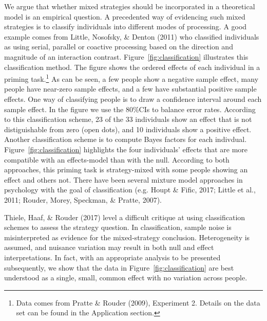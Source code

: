 \documentclass[english,man]{apa6}
\theoremstyle{definition}
\theoremstyle{definition}
\theoremstyle{remark}
\begin{document}
We argue that whether mixed strategies should be incorporated in a
theoretical model is an empirical question. A precedented way of
evidencing such mixed strategies is to classify individuals into
different modes of processing. A good example comes from Little,
Nosofsky, \& Denton (2011) who classified individuals as using serial,
parallel or coactive processing based on the direction and magnitude of
an interaction contrast. Figure~\ref{fig:classification} illustrates
this classification method. The figure shows the ordered effects of each
individual in a priming task.\footnote{Data comes from Pratte \& Rouder
  (2009), Experiment 2. Details on the data set can be found in the
  Application section.} As can be seen, a few people show a negative
sample effect, many people have near-zero sample effects, and a few have
substantial positive sample effects. One way of classifying people is to
draw a confidence interval around each sample effect. In the figure we
use the 80\%CIs to balance error rates. According to this classification
scheme, 23 of the 33 individuals show an effect that is not
distiguishable from zero (open dots), and 10 individuals show a positive
effect. Another classification scheme is to compute Bayes factors for
each indivdual. Figure~\ref{fig:classification} highlights the four
individuals' effects that are more compatible with an effects-model than
with the null. According to both approaches, this priming task is
strategy-mixed with some people showing an effect and others not. There
have been several mixture model approaches in psychology with the goal
of classification (e.g. Houpt \& Fific, 2017; Little et al., 2011;
Rouder, Morey, Speckman, \& Pratte, 2007).

Thiele, Haaf, \& Rouder (2017) level a difficult critique at using
classification schemes to assess the strategy question. In
classification, sample noise is misinterpreted as evidence for the
mixed-strategy conclusion. Heterogeneity is assumed, and nuisance
variation may result in both null and effect interpretations. In fact,
with an appropriate analysis to be presented subsequently, we show that
the data in Figure~\ref{fig:classification} are best understood as a
single, small, common effect with no variation across people.
\end{document}
